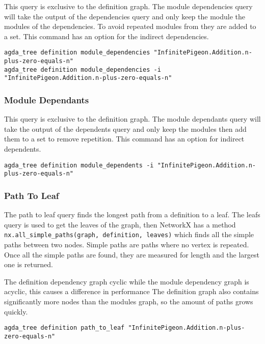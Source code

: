 This query is exclusive to the definition graph. The module dependencies query
will take the output of the dependencies query and only keep the module the
modules of the dependencies. To avoid repeated modules from they are added to a
set. This command has an option for the indirect dependencies.

\begin{lstlisting}
agda_tree definition module_dependencies "InfinitePigeon.Addition.n-plus-zero-equals-n"
agda_tree definition module_dependencies -i "InfinitePigeon.Addition.n-plus-zero-equals-n"
\end{lstlisting}

\subsubsection{Module Dependants}

This query is exclusive to the definition graph. The module dependants query
will take the output of the dependents query and only keep the modules then add
them to a set to remove repetition. This command has an option for indirect
dependents.

\begin{lstlisting}
agda_tree definition module_dependents -i "InfinitePigeon.Addition.n-plus-zero-equals-n"
\end{lstlisting}

\subsubsection{Path To Leaf}

The path to leaf query finds the longest path from a definition to a leaf. The
leafs query is used to get the leaves of the graph, then NetworkX has a
method \texttt{nx.all\_simple\_paths(graph, definition, leaves)} which finds all
the simple paths between two nodes. Simple paths are paths where no vertex is
repeated. Once all the simple paths are found, they are measured for length and
the largest one is returned.

The definition dependency graph cyclic while the module dependency graph is
acyclic, this causes a difference in performance  The definition graph also
contains significantly more nodes than the modules graph, so the amount of
paths grows quickly.

\begin{lstlisting}
agda_tree definition path_to_leaf "InfinitePigeon.Addition.n-plus-zero-equals-n"
\end{lstlisting}

